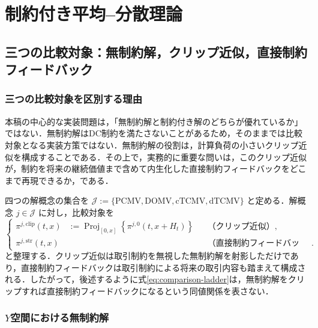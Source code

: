 \documentclass[10pt,a4paper]{article}
\theoremstyle{plain}
\theoremstyle{definition}
\DeclareMathOperator{\Proj}{Proj}
\begin{document}
\section{制約付き平均--分散理論}
\label{sec:theory}

\subsection{三つの比較対象：無制約解，クリップ近似，直接制約フィードバック}
\label{sec:strict-clip}

\subsubsection{三つの比較対象を区別する理由}

本稿の中心的な実装問題は，「無制約解と制約付き解のどちらが優れているか」ではない．無制約解はDC制約を満たさないことがあるため，そのままでは比較対象となる実装方策ではない．無制約解の役割は，計算負荷の小さいクリップ近似を構成することである．その上で，実務的に重要な問いは，このクリップ近似が，制約を将来の継続価値まで含めて内生化した直接制約フィードバックをどこまで再現できるか，である．

四つの解概念の集合を $\mathcal J:=\{\mathrm{PCMV},\mathrm{DOMV},\mathrm{cTCMV},\mathrm{dTCMV}\}$ と定める．解概念 $j\in\mathcal J$ に対し，比較対象を
\begin{equation}
\left\{
\begin{aligned}
\pi^{j,\mathrm{clip}}(t,x)
&:=\Proj_{[0,x]}\!\left\{\pi^{j,0}(t,x+H_t)\right\}
&&\text{（クリップ近似）},\\
\pi^{j,\mathrm{str}}(t,x)
&&&\text{（直接制約フィードバック）}.
\end{aligned}
\right.
\label{eq:comparison-ladder}
\end{equation}
と整理する．クリップ近似は取引制約を無視した無制約解を射影しただけであり，直接制約フィードバックは取引制約による将来の取引内容も踏まえて構成される．したがって，後述するように式\eqref{eq:comparison-ladder}は，無制約解をクリップすれば直接制約フィードバックになるという同値関係を表さない．

\subsubsection{$Y$空間における無制約解}
\end{document}
